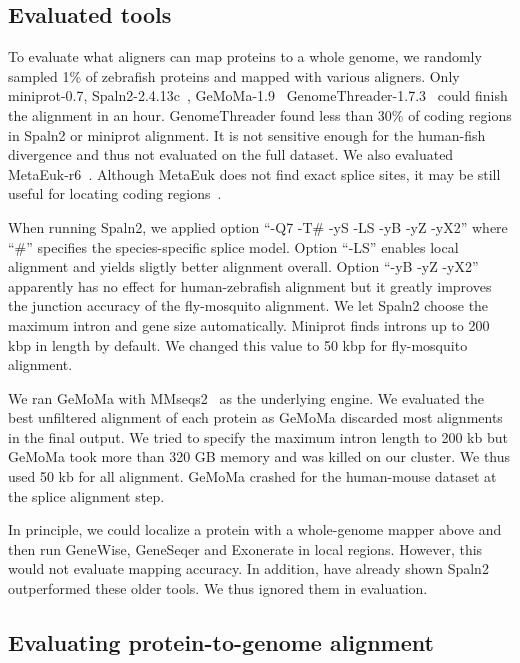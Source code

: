 \documentclass{bioinfo}
\begin{document}
\subsection{Evaluated tools}

To evaluate what aligners can map proteins to a whole genome, we randomly
sampled 1\% of zebrafish proteins and mapped with various aligners. Only
miniprot-0.7, Spaln2-2.4.13c~\citep{Iwata:2012aa}, GeMoMa-1.9~\citep{Keilwagen:2019wz}
GenomeThreader-1.7.3~\citep{DBLP:journals/infsof/GremmeBSK05} could finish the
alignment in an hour.  GenomeThreader found less than 30\% of coding regions in
Spaln2 or miniprot alignment. It is not sensitive enough for the human-fish
divergence and thus not evaluated on the full dataset. We also evaluated
MetaEuk-r6~\citep{Levy-Karin:2020to}. Although MetaEuk does not find exact
splice sites, it may be still useful for locating coding
regions~\citep{Manni:2021ww}.

When running Spaln2, we applied option ``-Q7 -T\# -yS -LS -yB -yZ -yX2'' where
``\#'' specifies the species-specific splice model. Option ``-LS'' enables
local alignment and yields sligtly better alignment overall. Option ``-yB -yZ
-yX2'' apparently has no effect for human-zebrafish alignment but it greatly
improves the junction accuracy of the fly-mosquito alignment. We let Spaln2
choose the maximum intron and gene size automatically. Miniprot finds introns
up to 200 kbp in length by default. We changed this value to 50 kbp for
fly-mosquito alignment.

We ran GeMoMa with MMseqs2~\citep{Steinegger:2017aa} as the underlying
engine. We evaluated the best unfiltered alignment of each protein as GeMoMa
discarded most alignments in the final output. We tried to specify the maximum
intron length to 200 kb but GeMoMa took more than 320 GB memory and was killed
on our cluster. We thus used 50 kb for all alignment. GeMoMa crashed for the
human-mouse dataset at the splice alignment step.

In principle, we could localize a protein with a whole-genome mapper above and
then run GeneWise, GeneSeqer and Exonerate in local regions. However, this
would not evaluate mapping accuracy. In addition, \citet{Iwata:2012aa} have
already shown Spaln2 outperformed these older tools. We thus ignored them in
evaluation.

\subsection{Evaluating protein-to-genome alignment}
\end{document}
